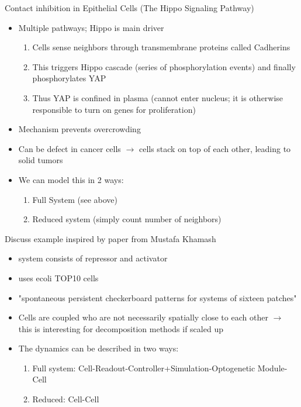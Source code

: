 Contact inhibition in Epithelial Cells (The Hippo Signaling Pathway)
\begin{itemize}
    \item Multiple pathways; Hippo is main driver \cite{Zhao2007}
    \begin{enumerate}
        \item Cells sense neighbors through transmembrane proteins called Cadherins \cite{Kim2011}
        \item This triggers Hippo cascade (series of phosphorylation events) and finally
            phosphorylates YAP \cite{Hao2008}
        \item Thus YAP is confined in plasma (cannot enter nucleus; it is otherwise responsible to
            turn on genes for proliferation)
    \end{enumerate}
    \item Mechanism prevents overcrowding
    \item Can be defect in cancer cells $\rightarrow$ cells stack on top of each other, leading to
        solid tumors \cite{Overholtzer2006}
    \item We can model this in 2 ways:
    \begin{enumerate}
        \item Full System (see above)
        \item Reduced system (simply count number of neighbors)
    \end{enumerate}
\end{itemize}

Discuss example inspired by paper from Mustafa Khamash \cite{Perkins2020}
\begin{itemize}
    \item system consists of repressor and activator
    \item uses \ac{ecoli} TOP10 cells
    \item "spontaneous persistent checkerboard patterns for systems of sixteen patches"
    \item Cells are coupled who are not necessarily spatially close to each other $\rightarrow$
        this is interesting for decomposition methods if scaled up
    \item The dynamics can be described in two ways:
    \begin{enumerate}
        \item Full system: Cell-Readout-Controller+Simulation-Optogenetic Module-Cell
        \item Reduced: Cell-Cell
    \end{enumerate}
\end{itemize}

